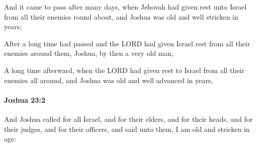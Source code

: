			\begin{versebox}
					\item[BHS] 
					\item[ASV] And it came to pass after many days, when Jehovah had given rest unto Israel from all their enemies round about, and Joshua was old and well stricken in years;
					\item[NIV] After a long time had passed and the LORD had given Israel rest from all their enemies around them, Joshua, by then a very old man,
					\item[NRSV] A long time afterward, when the LORD had given rest to Israel from all their enemies all around, and Joshua was old and well advanced in years,
			\end{versebox}

		\paragraph{Joshua 23:2} %
			\label{JOSHUA-23-2}

			And Joshua called for all Israel, and for their elders, and for their heads, and for their judges, and for their officers, and said unto them, I am old and stricken in age:

